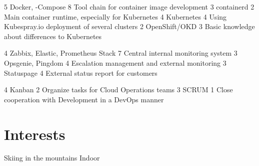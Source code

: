 \documentclass[11pt,a4paper,sans,final]{moderncv}
\begin{document}
				{5}	{Docker, -Compose}					{8}		{Tool chain for container image development}
		\cvskillentry		{}						{3}	{containerd}						{2}		{Main container runtime, especially for Kubernetes}
		\cvskillentry		{}						{4}	{Kubernetes}						{4}		{Using Kubespray.io deployment of several clusters}
		\cvskillentry		{}						{2}	{OpenShift/OKD}						{3}		{Basic knowledge about differences to Kubernetes}
		
					{4}	{Zabbix, Elastic, Prometheus Stack}	{7}		{Central internal monitoring system}
		\cvskillentry		{}						{3}	{Opsgenie, Pingdom}					{4}		{Escalation management and external monitoring}
		\cvskillentry		{}						{3}	{Statuspage}						{4}		{External status report for customers}

						{4}	{Kanban}							{2}		{Organize tasks for Cloud Operations teams}
		\cvskillentry[1em]	{}						{3}	{SCRUM}								{1}		{Close cooperation with Development in a DevOps manner}
	
	\section{Interests}
			{Skiing}
				{in the mountains}
				{Indoor}
	
	\clearpage

	
\end{document}
